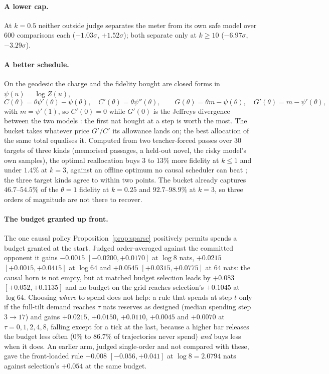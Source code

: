 \paragraph{A lower cap.}
At $k=0.5$ neither outside judge separates the meter from its own safe model over $600$ comparisons each
($-1.03\sigma$, $+1.52\sigma$); both separate only at $k \ge 10$ ($-6.97\sigma$, $-3.29\sigma$).

\paragraph{A better schedule.}
On the geodesic the charge and the fidelity bought are closed forms in $\psi(u) = \log Z(u)$,
\begin{equation}
C(\theta) = \theta\psi'(\theta) - \psi(\theta), \quad C'(\theta) = \theta\psi''(\theta), \qquad
G(\theta) = \theta m - \psi(\theta), \quad G'(\theta) = m - \psi'(\theta),
\label{eq:charge-gain}
\end{equation}
with $m = \psi'(1)$, so $C'(0) = 0$ while $G'(0)$ is the Jeffreys divergence between the two models
\citep{monteiropaes2026limits}: the first nat bought at a step is worth the most. The bucket takes whatever
price $G'/C'$ its allowance lands on; the best allocation of the same total equalises it. Computed from two
teacher-forced passes over $30$ targets of three kinds (memorised passages, a held-out novel, the risky
model's own samples), the optimal reallocation buys $3$ to $13\%$ more fidelity at $k \le 1$ and under
$1.4\%$ at $k=3$, against an offline optimum no causal scheduler can beat \citep{tomasi2026primaldual}; the
three target kinds agree to within two points. The bucket already captures $46.7$--$54.5\%$ of the
$\theta = 1$ fidelity at $k=0.25$ and $92.7$--$98.9\%$ at $k=3$, so three orders of magnitude are not there
to recover.

\paragraph{The budget granted up front.}
The one causal policy Proposition~\ref{prop:sparse} positively permits spends a budget granted at the
start. Judged order-averaged against the committed opponent it gains $-0.0015$ $[-0.0200,+0.0170]$ at
$\log 8$ nats, $+0.0215$ $[+0.0015,+0.0415]$ at $\log 64$ and $+0.0545$ $[+0.0315,+0.0775]$ at $64$ nats:
the causal horn is not empty, but at matched budget selection leads by $+0.083$ $[+0.052,+0.1135]$ and no
budget on the grid reaches selection's $+0.1045$ at $\log 64$. Choosing \emph{where} to spend does not help:
a rule that spends at step $t$ only if the full-tilt demand reaches $\tau$ nats reserves as designed (median
spending step $3 \to 17$) and gains $+0.0215$, $+0.0150$, $+0.0110$, $+0.0045$ and $+0.0070$ at
$\tau = 0,1,2,4,8$, falling except for a tick at the last, because a higher bar releases the budget less
often ($0\%$ to $86.7\%$ of trajectories never spend) \emph{and} buys less when it does. An earlier arm,
judged single-order and not compared with these, gave the front-loaded rule $-0.008$ $[-0.056, +0.041]$
at $\log 8 = 2.0794$ nats against selection's $+0.054$ at the same budget.

